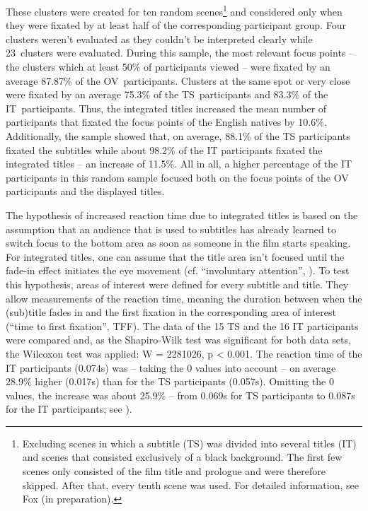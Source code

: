\documentclass[output=paper]{langsci/langscibook}
\begin{document}
These clusters were created for ten random scenes\footnote{Excluding scenes in which a subtitle (TS) was divided into several titles (IT) and scenes that consisted exclusively of a black background. The first few scenes only consisted of the film title and prologue and were therefore skipped. After that, every tenth scene was used. For detailed information, see Fox (in preparation).} and considered only when they were fixated by at least half of the corresponding participant group. Four clusters weren't evaluated as they couldn't be interpreted clearly while 23~clusters were evaluated. During this sample, the most relevant focus points -- the clusters which at least 50\% of participants viewed -- were fixated by an average 87.87\% of the OV~participants. Clusters at the same spot or very close were fixated by an average 75.3\% of the TS~participants and 83.3\% of the IT~participants. Thus, the integrated titles increased the mean number of participants that fixated the focus points of the English natives by 10.6\%. Additionally, the sample showed that, on average, 88.1\% of the TS participants fixated the subtitles while about 98.2\% of the IT participants fixated the integrated titles -- an increase of 11.5\%. All in all, a higher percentage of the IT participants in this random sample focused both on the focus points of the OV participants and the displayed titles.



The hypothesis of increased reaction time due to integrated titles is based on the assumption that an audience that is used to subtitles has already learned to switch focus to the bottom area as soon as someone in the film starts speaking. For integrated titles, one can assume that the title area isn't focused until the fade-in effect initiates the eye movement (cf. ``involuntary attention'', \citealt[74]{prinzmetal2005}). To test this hypothesis, areas of interest were defined for every subtitle and title. They allow measurements of the reaction time, meaning the duration between when the (sub)title fades in and the first fixation in the corresponding area of interest (``time to first fixation'', TFF). The data of the 15 TS and the 16 IT participants were compared and, as the Shapiro-Wilk test was significant for both data sets, the Wilcoxon test was applied: W = 2281026, p {\textless} 0.001. The reaction time of the IT participants (0.074s) was -- taking the 0 values into account -- on average 28.9\% higher (0.017s) than for the TS participants (0.057s). Omitting the 0 values, the increase was about 25.9\% -- from 0.069s for TS participants to 0.087s for the IT participants; see ).
\end{document}
